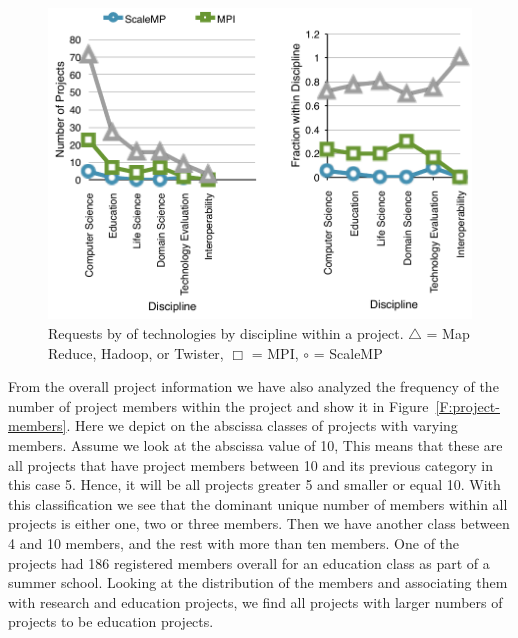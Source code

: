 \documentclass{article}
\begin{document}
\begin{figure}[p]
  \centering
    \includegraphics[width=.75\textwidth]{images/trend-b.pdf}
  \caption{Requests by of technologies by discipline within a
    project. $\bigtriangleup$ = Map Reduce, Hadoop, or Twister,
    $\Box$  = MPI, $\circ$ = ScaleMP}
   \label{F:trend-b}
\end{figure}


From the overall project information we have also analyzed the frequency of the number of project members within the project and show it in Figure~\ref{F:project-members}. Here we depict on the abscissa classes of projects with varying members.  Assume we look at the abscissa value of 10, This means that these are all projects that have project members between 10 and its previous category in this case 5. Hence, it will be all projects greater 5 and smaller or equal 10. With this classification we see that the dominant unique number of members within all projects is either one, two or three members. Then we have another class between 4 and 10 members, and the rest with more than ten members. One of the projects had 186 registered members overall for an education class as part of a summer school. Looking at the distribution of the members and associating them with research and education projects, we find all projects with larger numbers of projects to be education projects.








\end{document}
